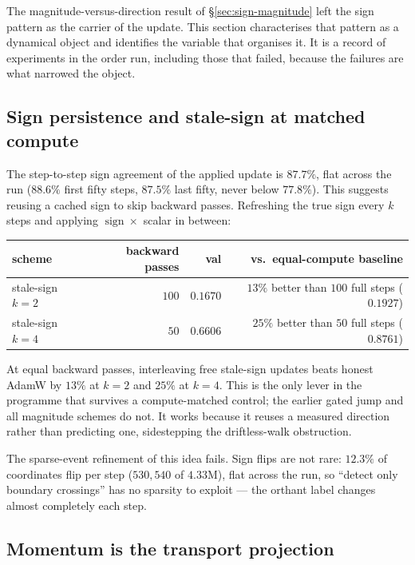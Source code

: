 The magnitude-versus-direction result of \S\ref{sec:sign-magnitude} left the
sign pattern as the carrier of the update. This section characterises that
pattern as a dynamical object and identifies the variable that organises it.
It is a record of experiments in the order run, including those that failed,
because the failures are what narrowed the object.

\subsection{Sign persistence and stale-sign at matched compute}
\label{sec:stalesign}

The step-to-step sign agreement of the applied update is $87.7\%$, flat across
the run ($88.6\%$ first fifty steps, $87.5\%$ last fifty, never below
$77.8\%$). This suggests reusing a cached sign to skip backward passes. Refreshing
the true sign every $k$ steps and applying $\operatorname{sign}\times$ scalar in
between:

\begin{center}
\begin{tabular}{lrrr}
\toprule
scheme & backward passes & val & vs.\ equal-compute baseline \\
\midrule
stale-sign $k=2$ & $100$ & $0.1670$ & $13\%$ better than $100$ full steps ($0.1927$) \\
stale-sign $k=4$ & $50$  & $0.6606$ & $25\%$ better than $50$ full steps ($0.8761$) \\
\bottomrule
\end{tabular}
\end{center}

\begin{observation}
At equal backward passes, interleaving free stale-sign updates beats honest
AdamW by $13\%$ at $k=2$ and $25\%$ at $k=4$. This is the only lever in the
programme that survives a compute-matched control; the earlier gated jump and
all magnitude schemes do not. It works because it reuses a measured direction
rather than predicting one, sidestepping the driftless-walk obstruction.
\end{observation}

The sparse-event refinement of this idea fails. Sign flips are not rare:
$12.3\%$ of coordinates flip per step ($530{,}540$ of $4.33$M), flat across the
run, so ``detect only boundary crossings'' has no sparsity to exploit --- the
orthant label changes almost completely each step.

\subsection{Momentum is the transport projection}
\label{sec:momentum}

